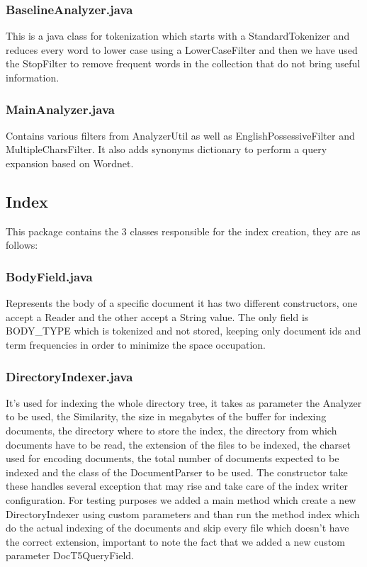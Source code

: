 \subsubsection{BaselineAnalyzer.java}
            
            This is a java class for tokenization which starts with a StandardTokenizer and reduces every word to lower case using a LowerCaseFilter and then we have used the StopFilter to remove frequent words in the collection that do not bring useful information. 
\subsubsection{MainAnalyzer.java}
            
            Contains various filters from AnalyzerUtil as well as EnglishPossessiveFilter and MultipleCharsFilter. It also adds synonyms dictionary to perform a query expansion based on Wordnet.
\subsection{Index}
  
     This package contains the 3 classes responsible for the index creation, they are as follows: 
     
\subsubsection{BodyField.java}
    
        Represents the body of a specific document it has two different constructors, one accept a Reader and the other accept a String value. The only field is BODY\_TYPE  which is tokenized and not stored, keeping only document ids and term frequencies in order to minimize the space occupation. 
\subsubsection{DirectoryIndexer.java}
    
        It's used for indexing the whole directory tree, it takes as parameter the Analyzer to be used, the Similarity, the size in megabytes of the buffer for indexing documents, the directory where to store the index, the directory from which documents have to be read, the extension of the files to be indexed, the charset used for encoding documents, the total number of documents expected to be indexed and the class of the DocumentParser to be used. The constructor take these handles several exception that may rise and take care of the index writer configuration. For testing purposes we added a main method which create a new DirectoryIndexer using custom parameters and than run the method index which do the actual indexing of the documents and skip every file which doesn't have the correct extension, important to note the fact that we added a new custom parameter DocT5QueryField. 
